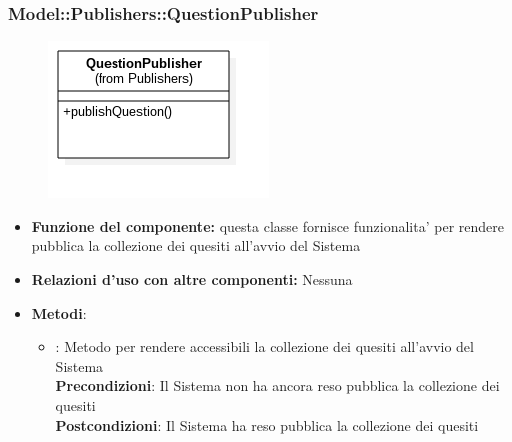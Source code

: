 \subsubsection{Model::Publishers::QuestionPublisher}
\begin{figure}[h!]
\begin{center}
	\includegraphics[scale=0.6]{../images/Model/Publishers/QuestionPublisher.png}
\end{center}
\end{figure}
\begin{itemize}
\item\textbf{Funzione del componente:} questa classe fornisce funzionalita' per rendere pubblica la collezione dei quesiti all'avvio del Sistema
\item\textbf{Relazioni d'uso con altre componenti:} Nessuna \\
\item\textbf{Metodi}:
	\begin{itemize}
		\item{} : Metodo per rendere accessibili la collezione dei quesiti all'avvio del Sistema\\
		\textbf{Precondizioni}: Il Sistema non ha ancora reso pubblica la collezione dei quesiti\\
		\textbf{Postcondizioni}: Il Sistema ha reso pubblica la collezione dei quesiti\\
	\end{itemize}
\end{itemize}